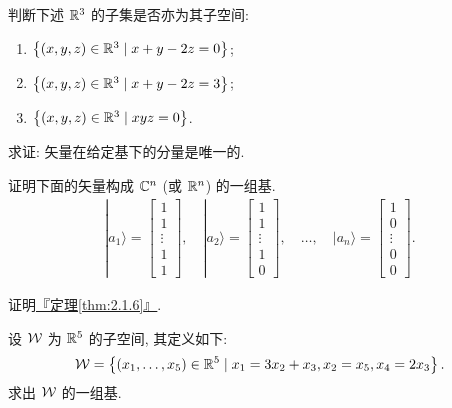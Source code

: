 \documentclass[lang=cn,zihao=-4,twoside,fontset=none]{textbook}
\def\eq#1{\[\begin{aligned}{}#1\end{aligned}\]}
\newcommand{\thmref}[1]{\hyperref[#1]{『定理\textnormal{\ref*{#1}}』}}
\newcommand{\Set}[1]{\left\{#1\right\}}
\renewcommand{\ket}[1]{| #1 \rangle}
\begin{document}
\begin{problem}
    \label{ex:2.3}%
    判断下述 ${\mathbb R}^3$ 的子集是否亦为其子空间:
    \begin{enumerate}[label=\textnormal{(\alph*)}]
        \item $\Set{(x,y,z)\in\bR^3\mid x+y-2z=0}$;
        \item $\Set{(x,y,z)\in\bR^3\mid x+y-2z=3}$;
        \item $\Set{(x,y,z)\in\bR^3\mid xyz=0}$.
    \end{enumerate}
\end{problem}

\begin{problem}
    \label{ex:2.4}%
    求证: 矢量在给定基下的分量是唯一的.
\end{problem}

\begin{problem}
    \label{ex:2.5}%
    证明下面的矢量构成 ${\mathbb C}^n$ (或 ${\mathbb R}^n$) 的一组基. 
    \eq{
        \ket{a_1}=\begin{bmatrix}
            1 \\ 1 \\ \vdots \\ 1 \\ 1
        \end{bmatrix},\quad \ket{a_2}=\begin{bmatrix}
            1 \\ 1 \\ \vdots \\ 1 \\ 0
        \end{bmatrix},\quad\dots,\quad  \ket{a_n}=\begin{bmatrix}
            1 \\ 0 \\ \vdots \\ 0 \\ 0
        \end{bmatrix}.
    }
\end{problem}

\begin{problem}
    \label{ex:2.6}%
    证明\thmref{thm:2.1.6}.
\end{problem}

\begin{problem}
    \label{ex:2.7}%
    设 ${\mathcal W}$ 为 ${\mathbb R}^5$ 的子空间, 其定义如下:
    \eq{
        \mW = \Set{(x_1,\dots,x_5)\in\bR^5 \mid x_1=3x_2+x_3,x_2=x_5, x_4=2x_3}.
    }
    求出 ${\mathcal W}$ 的一组基. 
\end{problem}
\end{document}
